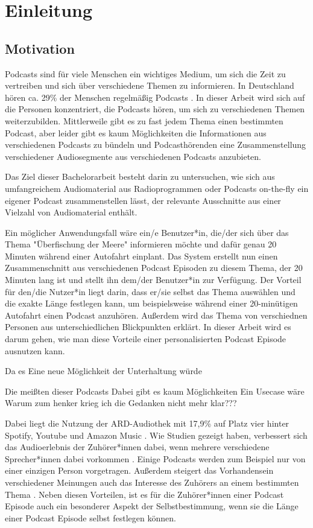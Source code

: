 \chapter{Einleitung}\label{ch:intro}

\section{Motivation}

Podcasts sind für viele Menschen ein wichtiges Medium, um sich die Zeit zu vertreiben und sich über verschiedene Themen zu informieren. 
In Deutschland hören ca. 29\% der Menschen regelmäßig Podcasts \cite{newman2022}.
In dieser Arbeit wird sich auf die Personen konzentriert, die Podcasts hören, um sich zu verschiedenen Themen weiterzubilden.
Mittlerweile gibt es zu fast jedem Thema einen bestimmten Podcast, aber leider gibt es kaum Möglichkeiten die Informationen aus verschiedenen Podcasts zu bündeln und Podcasthörenden eine Zusammenstellung verschiedener Audiosegmente aus verschiedenen Podcasts anzubieten.

Das Ziel dieser Bachelorarbeit besteht darin zu untersuchen, wie sich aus umfangreichem Audiomaterial aus Radioprogrammen oder Podcasts on-the-fly ein eigener Podcast zusammenstellen lässt, der relevante Ausschnitte aus einer Vielzahl von Audiomaterial enthält.

Ein möglicher Anwendungsfall wäre ein/e Benutzer*in, die/der sich über das Thema "Überfischung der Meere" informieren möchte und dafür genau 20 Minuten während einer Autofahrt einplant. 
Das System erstellt nun einen Zusammenschnitt aus verschiedenen Podcast Episoden zu diesem Thema, der 20 Minuten lang ist und stellt ihn dem/der Benutzer*in zur Verfügung. 
Der Vorteil für den/die Nutzer*in liegt darin, dass er/sie selbst das Thema auswählen und die exakte Länge festlegen kann, um beispielsweise während einer 20-minütigen Autofahrt einen Podcast anzuhören. 
Außerdem wird das Thema von verschiednen Personen aus unterschiedlichen Blickpunkten erklärt. 
In dieser Arbeit wird es darum gehen, wie man diese Vorteile einer personalisierten Podcast Episode ausnutzen kann.


Da es
Eine neue Möglichkeit der Unterhaltung würde 

Die meißten dieser Podcasts 
Dabei gibt es kaum Möglichkeiten 
Ein Usecase wäre
Warum zum henker krieg ich die Gedanken nicht mehr klar???

Dabei liegt die Nutzung der ARD-Audiothek mit 17,9\% auf Platz vier hinter Spotify, Youtube und Amazon Music \cite{mindline-media2023}.
Wie Studien gezeigt haben, verbessert sich das Audioerlebnis der Zuhörer*innen dabei, wenn mehrere verschiedene Sprecher*innen dabei vorkommen \cite{kang2012}. 
Einige Podcasts werden zum Beispiel nur von einer einzigen Person vorgetragen.
Außerdem steigert das Vorhandensein verschiedener Meinungen auch das Interesse des Zuhörers an einem bestimmten Thema \cite{phillips2014}.
Neben diesen Vorteilen, ist es für die Zuhörer*innen einer Podcast Episode auch ein besonderer Aspekt der Selbstbestimmung, wenn sie die Länge einer Podcast Episode selbst festlegen können.




